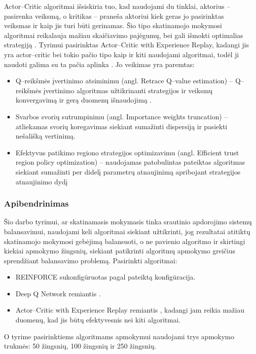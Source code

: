 \documentclass{VUMIFPSbakalaurinis}
\begin{document}
Actor–Critic algoritmai išsiskiria tuo, kad naudojami du tinklai, aktorius – pasirenka veiksmą, o kritikas – praneša aktoriui kiek geras jo pasirinktas veiksmas ir kaip jis turi būti gerinamas. Šio tipo skatinamojo mokymosi algoritmai reikalauja mažiau skaičiavimo pajėgumų, bei gali išmokti optimalias strategiją \cite{sutton2018reinforcement}. Tyrimui pasirinktas Actor–Critic with Experience Replay, kadangi jis yra actor–critic bei tokio pačio tipo kaip ir kiti naudojami algoritmai, todėl ji naudoti galima su ta pačia aplinka \cite{wang2016sample}. Jo veikimas yra paremtas:
\begin{itemize}
    \item Q–reikšmės įvertinimo atsiminimu (angl. Retrace Q–value estimation) – Q–reikšmės įvertinimo algoritmas užtikrinanti strategijos ir veiksmų konvergavimą ir gerą duomenų išnaudojimą \cite{munos2016safe}.
    \item Svarbos svorių sutrumpinimu (angl. Importance weights truncation) – atliekamas svorių koregavimas siekiant sumažinti dispersiją ir pasiekti nešališką vertinimą.
    \item Efektyvus patikimo regiono strategijos optimizavimu (angl. Efficient trust region policy optimization) – naudojamas patobulintas \cite{schulman2015trust} pateiktas algoritmas siekiant sumažinti per didelį parametrų atnaujinimą apribojant strategijos atnaujinimo dydį 
\end{itemize}

\subsubsection{Apibendrinimas}

Šio darbo tyrimui, ar skatinamasis mokymasis tinka srautinio apdorojimo sistemų balansavimui, naudojami keli algoritmai siekiant užtikrinti, jog rezultatai atitiktų skatinamojo mokymosi gebėjimą balansuoti, o ne pavienio algoritmo ir skirtingi kiekiai apmokymo žingsnių, siekiant patikrinti algoritmų apmokymo greičius sprendžiant balansavimo problemą. Pasirinkti algoritmai: 
\begin{itemize}
    \item REINFORCE \cite{williams1992simple} sukonfigūruotas pagal \cite{vaquero2018autotuning} pateiktą konfigūracija.
    \item Deep Q Network remiantis \cite{mnih2015human}.
    \item Actor–Critic with Experience Replay remiantis \cite{wang2016sample}, kadangi jam reikia mažiau duomenų, kad jis būtų efektyvesnis nei kiti algoritmai.
\end{itemize}
O tyrime pasirinktiems algoritmams apmokymui naudojami trys apmokymo trukmės: 50 žingsnių, 100 žingsnių ir 250 žingsnių.
\end{document}

